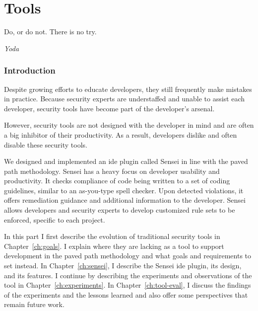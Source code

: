 \part{Tools}
\label{p:tools}
\epigraph{Do, or do not. There is no try.}{\textit{Yoda}}

\clearpage
\section*{Introduction}

Despite growing efforts to educate developers, they still frequently make mistakes in practice.
Because security experts are understaffed and unable to assist each developer, security tools have become part of the developer's arsenal.

However, security tools are not designed with the developer in mind and are often a big inhibitor of their productivity. As a result, developers dislike and often disable these security tools. 


We designed and implemented an \gls{ide} plugin called Sensei in line with the paved path methodology.
Sensei has a heavy focus on developer usability and productivity.
It checks compliance of code being written to a set of coding guidelines, similar to an as-you-type spell checker.
Upon detected violations, it offers remediation guidance and additional information to the developer.
Sensei allows developers and security experts to develop customized rule sets to be enforced, specific to each project.

In this part I first describe the evolution of traditional security tools in Chapter~\ref{ch:goals}.
I explain where they are lacking as a tool to support development in the paved path methodology and what goals and requirements to set instead.
In Chapter~\ref{ch:sensei}, I describe the Sensei \gls{ide} plugin, its design, and its features.
I continue by describing the experiments and observations of the tool in Chapter~\ref{ch:experiments}.
In Chapter~\ref{ch:tool-eval}, I discuss the findings of the experiments and the lessons learned and also offer some perspectives that remain future work.

%
%

